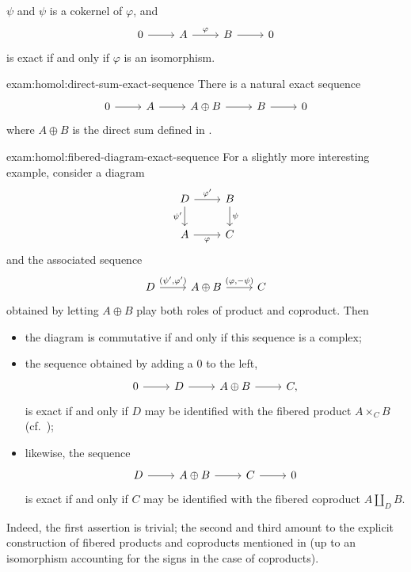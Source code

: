 $\psi$ and $\psi$ is a cokernel of $\varphi$, and
\[\begin{tikzcd}
    0 \arrow[r] & A \arrow[r, "\varphi"] & B \arrow[r] & 0
  \end{tikzcd}\] is exact if and only if $\varphi$ is an isomorphism.
\begin{exam}{}{exam:homol:direct-sum-exact-sequence}
  There is a natural exact sequence
  \[\begin{tikzcd}
      0 \arrow[r] & A \arrow[r] & A \oplus B \arrow[r] & B \arrow[r] &
      0
    \end{tikzcd}\] where $A \oplus B$ is the direct sum defined in
  .
\end{exam}
\begin{exam}{}{exam:homol:fibered-diagram-exact-sequence}
  For a slightly more interesting example, consider a diagram
  \[\begin{tikzcd}
      D \arrow[r, "\varphi'"] \arrow[d, "\psi'"'] & B \arrow[d, "\psi"] \\
      A \arrow[r, "\varphi"'] & C
    \end{tikzcd}\] and the associated sequence
  \[\begin{tikzcd}
      D \arrow[r, "{(\psi', \varphi')}"] & A \oplus B \arrow[r,
      "{(\varphi, -\psi)}"] & C
    \end{tikzcd}\] obtained by letting $A \oplus B$ play both roles of
  product and coproduct. Then
  \begin{itemize}
  \item the diagram is commutative if and only if this sequence is a
    complex;
  \item the sequence obtained by adding a $0$ to the left,
    \[\begin{tikzcd}
        0 \arrow[r] & D \arrow[r] & A \oplus B \arrow[r] & C,
      \end{tikzcd}\] is exact if and only if $D$ may be identified
    with the fibered product $A \times_C B$ (cf.\
    );
  \item likewise, the sequence
    \[\begin{tikzcd}
        D \arrow[r] & A \oplus B \arrow[r] & C \arrow[r] & 0
      \end{tikzcd}\] is exact if and only if $C$ may be identified
    with the fibered coproduct $A \amalg_D B$.
  \end{itemize}
  Indeed, the first assertion is trivial; the second and third amount
  to the explicit construction of fibered products and coproducts
  mentioned in 
  (up to an isomorphism accounting for the signs in the case of
  coproducts).
\end{exam}

